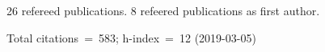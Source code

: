 26 refereed publications. 8 refeered publications as first author.

Total citations~=~583; h-index~=~12 (2019-03-05)